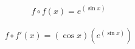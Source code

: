 \documentclass{article}
\begin{document}
$$f\circ f(x) = e^{\left(\sin{x}\right)}$$ \\ $$f\circ f'(x) = (\cos{x})(e^{\left(\sin{x}\right)})$$
\end{document}
